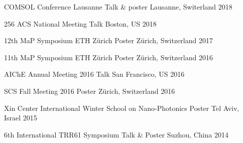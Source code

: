 
\begin{cvtalks}
  \cvtalk
  {COMSOL Conference Lausanne}
  {Talk \& poster}
  {Lausanne, Switerland}
  {2018}

  \cvtalk
  {256 ACS National Meeting}
  {Talk}
  {Boston, US}
  {2018}

  \cvtalk
  {12th MaP Symposium ETH Z\"{u}rich}
  {Poster}
  {Z\"{u}rich, Switzerland}
  {2017}

  \cvtalk
  {11th MaP Symposium ETH Z\"{u}rich}
  {Poster}
  {Z\"{u}rich, Switzerland}
  {2016}

  \cvtalk
  {AIChE Annual Meeting 2016}
  {Talk}
  {San Francisco, US}
  {2016}

  \cvtalk
  {SCS Fall Meeting 2016}
  {Poster}
  {Z\"{u}rich, Switzerland}
  {2016}

  \cvtalk
  {Xin Center International Winter School on Nano-Photonics}
  {Poster}
  {Tel Aviv, Israel}
  {2015}

  \cvtalk
  {6th International TRR61 Symposium}
  {Talk \& Poster}
  {Suzhou, China}
  {2014}

\end{cvtalks}